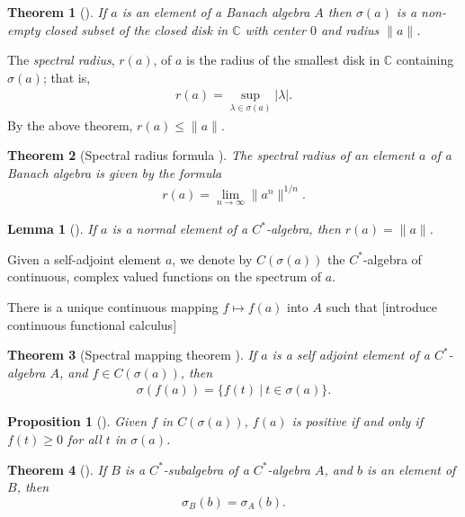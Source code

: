 \documentclass[12pt,a4paper]{report}
\theoremstyle{plain}
\newtheorem*{thm*}{Theorem}
\newtheorem{lemma}{Lemma}
\newtheorem{prop}{Proposition}
\theoremstyle{definition}
\newcommand{\1}{\mathbbm{1}}
\newcommand{\C}{\mathbb{C}}
\newcommand{\spec}[1]{\sigma(#1)}
\begin{document}
\begin{thm*}[{\cite[3.2.3]{kadison83}}]
	If $a$ is an element of a Banach algebra $A$ then $\spec a$ is a non-empty closed subset of the
	closed disk in $\C$ with center $0$ and radius $\|a\|$.
\end{thm*}

The \emph{spectral radius}, $r(a)$, of $a$ is the radius of the smallest disk in $\C$ containing 
$\spec a$; that is, 
\begin{align*}
	r(a)=\sup_{\lambda\in\spec a}{|\lambda|}.
\end{align*}
By the above theorem, $r(a)\leq\|a\|$. 

\begin{thm*}[Spectral radius formula {\cite[3.3.3]{kadison83}}]
	The spectral radius of an element $a$ of a Banach algebra is given by the formula
	\begin{align*}
		r(a)= \lim_{n\to\infty} \|a^n\|^{1/n}.
	\end{align*}
\end{thm*}

\begin{lemma}[{\cite[4.1.1(i)]{kadison83}}]
	If $a$ is a normal element of a $C^\ast$-algebra, then $r(a)=\|a\|$.
\end{lemma}

Given a self-adjoint element $a$, we denote by $C(\spec a)$ the $C^\ast$-algebra of continuous, complex 
valued functions on the spectrum of $a$. 


There is a unique continuous mapping $f\mapsto f(a)$ into $A$ such 
that [introduce continuous functional calculus] 


\begin{thm*}[Spectral mapping theorem {\cite[4.1.6]{kadison83}}]
	If $a$ is a self adjoint element of a $C^\ast$-algebra $A$, and $f\in C(\spec a)$, then
	\begin{align*}
		\spec{f(a)} = \{f(t) ~|~ t \in \spec a\}.
	\end{align*}
\end{thm*}

\begin{prop}[{\cite[4.2.3(i)]{kadison83}}]\label{prop:423}
	Given $f$ in $C(\spec a)$, $f(a)$ is positive if and only if $f(t)\geq0$ for all $t$ in $\spec a$.
\end{prop}

\begin{thm*}[{\cite[4.1.5]{kadison83}}]
	If $B$ is a $C^\ast$-subalgebra of a $C^\ast$-algebra $A$, and $b$ is an element of $B$, then 
	\[
		\sigma_B(b) =\sigma_A(b).
	\]
\end{thm*}
\end{document}
